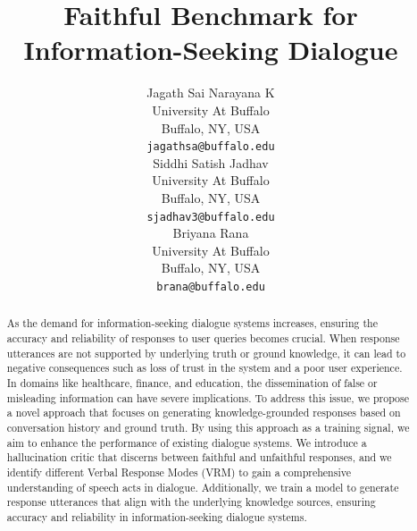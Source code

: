 \documentclass[11pt]{article}
\title{Faithful Benchmark for Information-Seeking Dialogue}
\author{Jagath Sai Narayana K \\
  University At Buffalo \\
  Buffalo, NY, USA\\
  \texttt{jagathsa@buffalo.edu} \\\And
  Siddhi Satish Jadhav \\
  University At Buffalo \\
  Buffalo, NY, USA\\
  \texttt{sjadhav3@buffalo.edu} \\\And
  Briyana Rana \\
  University At Buffalo \\
  Buffalo, NY, USA\\
  \texttt{brana@buffalo.edu}}
\begin{document}
\makeatletter\acl@finalcopytrue\maketitle
\begin{abstract}
As the demand for information-seeking dialogue systems increases, ensuring the accuracy and reliability of responses to user queries becomes crucial. When response utterances are not supported by underlying truth or ground knowledge, it can lead to negative consequences such as loss of trust in the system and a poor user experience. In domains like healthcare, finance, and education, the dissemination of false or misleading information can have severe implications. To address this issue, we propose a novel approach that focuses on generating knowledge-grounded responses based on conversation history and ground truth. By using this approach as a training signal, we aim to enhance the performance of existing dialogue systems. We introduce a hallucination critic that discerns between faithful and unfaithful responses, and we identify different Verbal Response Modes (VRM) to gain a comprehensive understanding of speech acts in dialogue. Additionally, we train a model to generate response utterances that align with the underlying knowledge sources, ensuring accuracy and reliability in information-seeking dialogue systems.
\end{abstract}
\end{document}
